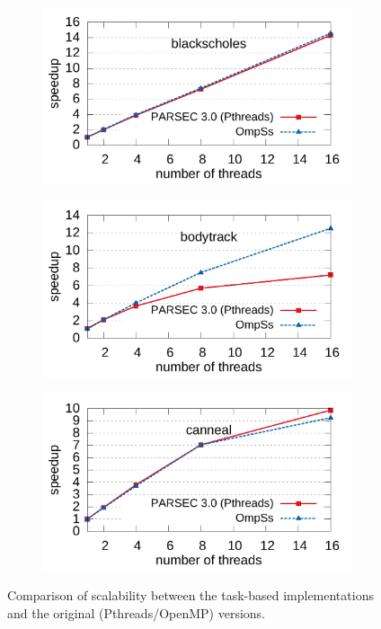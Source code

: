 \begin{figure}[p]
        \centering
        \begin{subfigure}{0.8\textwidth}
                \includegraphics[width=\textwidth]{ifcg/figures/blackscholes_scale}
                \label{fig:blackscholes_scale}
        \end{subfigure}%
\hfill
        \begin{subfigure}{0.8\textwidth}
                \includegraphics[width=\textwidth]{ifcg/figures/bodytrack_scale}
                \label{fig:bodytrack_scale}
        \end{subfigure}
        
				\begin{subfigure}[b]{0.8\textwidth}
                \includegraphics[width=\textwidth]{ifcg/figures/canneal_scale}
                \label{fig:canneal_scale}
        \end{subfigure}
      \caption{Comparison of scalability between the task-based implementations and the original (Pthreads/OpenMP) versions.}
			\label{fig:scalability_graphs_1}
\end{figure}

